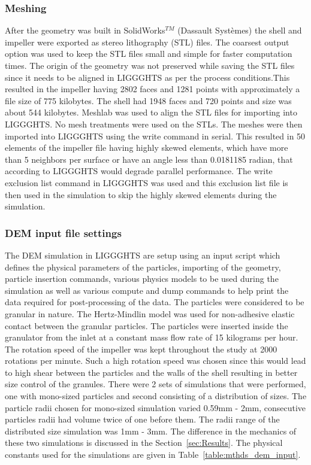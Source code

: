 \documentclass[preprint,11pt,authoryear]{elsarticle}
\begin{document}
\subsubsection{Meshing}
 After the geometry was built in SolidWorks$^{TM}$ (Dassault Syst\`{e}mes) the shell and impeller 
were exported as stereo lithography (STL) files. The coarsest output option was used to keep the STL files 
small and simple for faster computation times. The origin of the geometry was not preserved while saving 
the STL files since it needs to be aligned in LIGGGHTS as per the process conditions.This resulted in 
the impeller having 2802 faces and 1281 points with approximately a file size of 775 kilobytes. 
The shell had 1948 faces and 720 points and size was about 544 kilobytes. Meshlab was used to 
align the STL files for importing into LIGGGHTS. No mesh treatments were used on the STLs. 
The meshes were then imported into LIGGGHTS using the write command in serial. This resulted 
in 50 elements of the impeller file having highly skewed elements, which have more than 5 
neighbors per surface or have an angle less than 0.0181185 radian, that according to LIGGGHTS 
would degrade parallel performance. The write exclusion list command in LIGGGHTS was used and 
this exclusion list file is then used in the simulation to skip the highly skewed elements during 
the simulation. 


\subsubsection{DEM input file settings}
The DEM simulation in LIGGGHTS are setup using an input script which defines the physical 
parameters of the particles, importing of the geometry, particle insertion commands, various physics 
models to be used during the simulation as well as various compute and dump commands to help print 
the data required for post-processing of the data. The particles were considered to be granular in 
nature. The Hertz-Mindlin model was used for non-adhesive elastic contact between the granular particles. 
The particles were inserted inside the granulator from the inlet at a constant mass flow rate of 15 
kilograms per hour. The rotation speed of the impeller was kept throughout the study at 2000 rotations 
per minute. Such a high rotation speed was chosen since this would lead to high shear between the 
particles and the walls of the shell resulting in better size control of the granules. There were 2 sets of 
simulations that were performed, one with mono-sized particles and second consisting of a distribution 
of sizes. The particle radii chosen for mono-sized simulation varied 0.59mm - 2mm, consecutive 
particles radii had volume twice of one before them. The radii range of the distributed size simulation 
was 1mm - 3mm. The difference in the mechanics of these two simulations is discussed in the Section~\ref{sec:Results}. 
The physical constants used for the simulations are given in Table~\ref{table:mthds_dem_input}.
\end{document}
